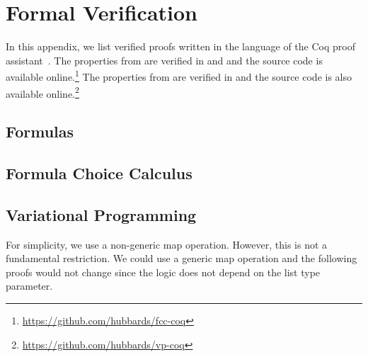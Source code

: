 \chapter{Formal Verification}
\label{app:coq}

In this appendix, we list verified proofs written in the language of the Coq proof assistant~\citep{BC04}.
The properties from  are verified in  and  and the source code is available online.\footnote{\url{https://github.com/hubbards/fcc-coq}}
The properties from  are verified in  and the source code is also available online.\footnote{\url{https://github.com/hubbards/vp-coq}}

\section{Formulas}
\label{app:f-coq}



\cleardoublepage

\section{Formula Choice Calculus}
\label{app:fcc-coq}



\cleardoublepage

\section{Variational Programming}
\label{app:vp-coq}

For simplicity, we use a non-generic map operation.
However, this is not a fundamental restriction.
We could use a generic map operation and the following proofs would not change since the logic does not depend on the list type parameter.



\cleardoublepage
